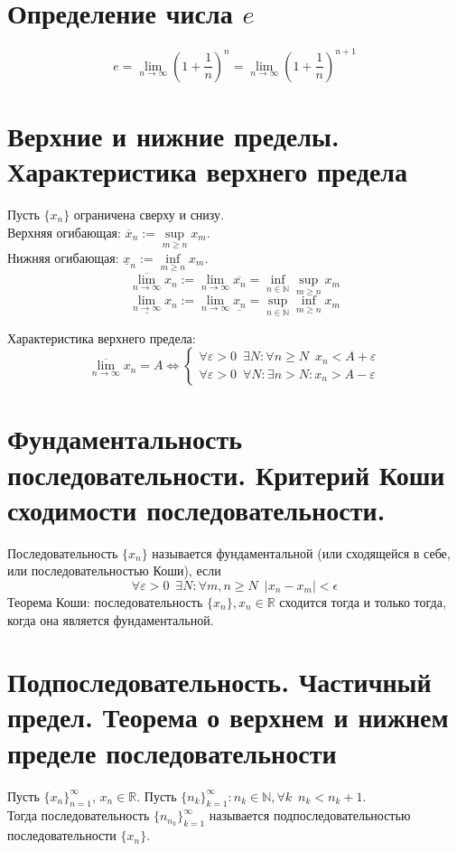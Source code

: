 \documentclass[11pt, a4paper, utf-8]{article}
\def\R{\mathbb{R}}
\def\N{\mathbb{N}}
\def\sp{\, \, \,}
\def\linf{\lim \limits_{n \to \infty}}
\begin{document}
    \section{Определение числа $e$}
    \[e = \linf \left(1+\frac{1}{n}\right)^n = \linf \left(1+\frac{1}{n}\right)^{n+1}\]

    \section{Верхние и нижние пределы. Характеристика верхнего предела}
    Пусть $\{x_n\}$ ограничена сверху и снизу.\\
    Верхняя огибающая: $\overline{x}_n := \sup \limits_{m \geq n} x_m$.\\
    Нижняя огибающая: $\underline{x}_n := \inf \limits_{m \geq n} x_m$.\\
    \[\overline{\linf} x_n := \linf \overline{x_n} = \inf \limits_{n \in \N} \sup \limits_{m \geq n} x_m\]
    \[\underline{\linf} x_n := \linf \underline{x_n} = \sup \limits_{n \in \N} \inf \limits_{m \geq n} x_m\]

    Характеристика верхнего предела:
    $$\overline{\linf} x_n = A \iff
    \begin{cases}
        \forall \varepsilon > 0 \sp \exists N: \forall n \geq N \sp x_n < A + \varepsilon \\
        \forall \varepsilon > 0 \sp \forall N: \exists n > N: x_n > A - \varepsilon
    \end{cases}$$

    \section{Фундаментальность последовательности. Критерий Коши сходимости последовательности.}
    Последовательность $\{x_n\}$ называется фундаментальной (или сходящейся в себе, или последовательностью Коши), если
    $$\forall \varepsilon > 0 \sp \exists N: \forall m,n \geq N \sp |x_n - x_m| < \epsilon$$
    Теорема Коши: последовательность $\{x_n\}, x_n \in \R$ сходится тогда и только тогда, когда она является фундаментальной.

    \section{Подпоследовательность. Частичный предел. Теорема о верхнем и нижнем пределе последовательности}
    Пусть $\{x_n\}_{n=1}^{\infty}$, $x_n \in \R$. Пусть $\{n_k\}_{k=1}^{\infty}: n_k \in \N , \forall k \sp n_k < n_k+1$.\\
    Тогда последовательность $\{n_{n_k}\}_{k=1}^{\infty}$ называется подпоследовательностью последовательности $\{x_n\}$.\\
    
\end{document}
